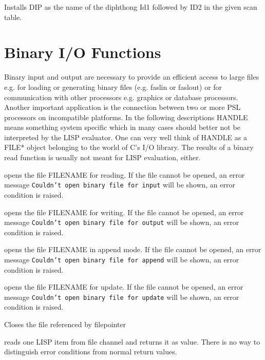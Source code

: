 {    Installs  DIP  as  the name of the diphthong Id1 followed by
    ID2 in the given scan table.
}

\section{Binary I/O Functions}

Binary input and output are necessary to provide an efficient access to
large files e.g. for loading or generating binary files (e.g. faslin
or faslout) or for
communication with other
processors e.g. graphics or database processors.
Another important application is the connection between two or more
PSL processors on incompatible platforms.
In the following descriptions HANDLE means something system specific
which in many cases should better not be interpreted by the LISP
evaluator. One can very well think of HANDLE as a FILE* object
belonging to the world of C's I/O library.
The results of a binary read function is usually not
meant for LISP evaluation, either.

{opens the file FILENAME for reading. If the file cannot be opened,
an error message {\tt Couldn't open binary file for input} will be shown,
an error condition is raised.}

{opens the file FILENAME for writing. If the file cannot be opened,
an error message {\tt Couldn't open binary file for output} will be shown,
an error condition is raised.}

{opens the file FILENAME in append mode. If the file cannot be opened,
an error message {\tt Couldn't open binary file for append} will be shown,
an error condition is raised.}

{opens the file FILENAME for update. If the file cannot be opened,
an error message {\tt Couldn't open binary file for update} will be shown,
an error condition is raised.}

{Closes the file referenced by filepointer}

{reads one LISP item from file channel and returns it as value. There is
no way to distinguish error conditions from normal return values.}

